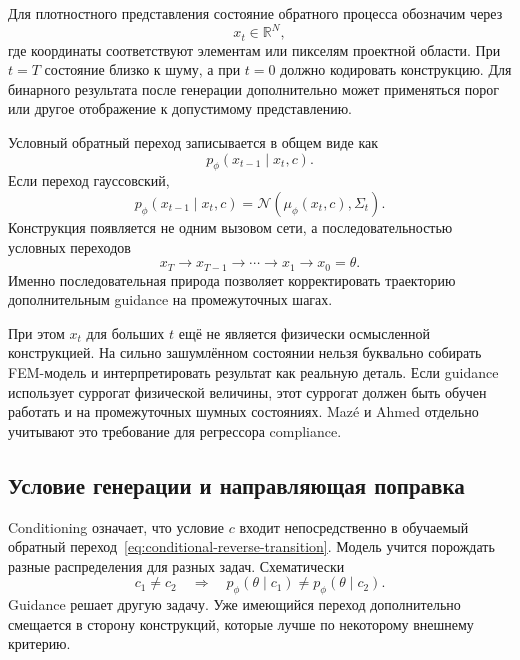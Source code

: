 Для плотностного представления состояние обратного процесса обозначим через
\begin{equation}
 x_t\in\mathbb R^N,
\end{equation}
где координаты соответствуют элементам или пикселям проектной области. При $t=T$ состояние близко к шуму, а при $t=0$ должно кодировать конструкцию. Для бинарного результата после генерации дополнительно может применяться порог или другое отображение к допустимому представлению.

Условный обратный переход записывается в общем виде как
\begin{equation}
\label{eq:conditional-reverse-transition}
 p_\phi(x_{t-1}\mid x_t,c).
\end{equation}
Если переход гауссовский,
\begin{equation}
\label{eq:gaussian-reverse-transition}
 p_\phi(x_{t-1}\mid x_t,c)
 =
 \mathcal N\!\left(
  \mu_\phi(x_t,c),
  \Sigma_t
 \right).
\end{equation}
Конструкция появляется не одним вызовом сети, а последовательностью условных переходов
\begin{equation}
 x_T\to x_{T-1}\to\cdots\to x_1\to x_0=\theta.
\end{equation}
Именно последовательная природа позволяет корректировать траекторию дополнительным guidance на промежуточных шагах.

При этом $x_t$ для больших $t$ ещё не является физически осмысленной конструкцией. На сильно зашумлённом состоянии нельзя буквально собирать FEM-модель и интерпретировать результат как реальную деталь. Если guidance использует суррогат физической величины, этот суррогат должен быть обучен работать и на промежуточных шумных состояниях. Mazé и Ahmed отдельно учитывают это требование для регрессора compliance.

\subsection{Условие генерации и направляющая поправка}

Conditioning означает, что условие $c$ входит непосредственно в обучаемый обратный переход~\eqref{eq:conditional-reverse-transition}. Модель учится порождать разные распределения для разных задач. Схематически
\begin{equation}
 c_1\neq c_2
 \quad\Longrightarrow\quad
 p_\phi(\theta\mid c_1)
 \neq
 p_\phi(\theta\mid c_2).
\end{equation}
Guidance решает другую задачу. Уже имеющийся переход дополнительно смещается в сторону конструкций, которые лучше по некоторому внешнему критерию.

